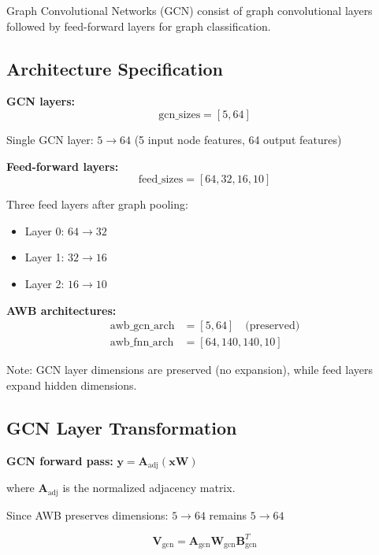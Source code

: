 \documentclass[11pt]{article}
\begin{document}
Graph Convolutional Networks (GCN) consist of graph convolutional layers followed by feed-forward layers for graph classification.

\subsection{Architecture Specification}

\textbf{GCN layers:}
\begin{equation}
\text{gcn\_sizes} = [5, 64]
\end{equation}

Single GCN layer: $5 \rightarrow 64$ (5 input node features, 64 output features)

\textbf{Feed-forward layers:}
\begin{equation}
\text{feed\_sizes} = [64, 32, 16, 10]
\end{equation}

Three feed layers after graph pooling:
\begin{itemize}
    \item Layer 0: $64 \rightarrow 32$
    \item Layer 1: $32 \rightarrow 16$
    \item Layer 2: $16 \rightarrow 10$
\end{itemize}

\textbf{AWB architectures:}
\begin{align}
\text{awb\_gcn\_arch} &= [5, 64] \quad \text{(preserved)} \\
\text{awb\_fnn\_arch} &= [64, 140, 140, 10]
\end{align}

Note: GCN layer dimensions are preserved (no expansion), while feed layers expand hidden dimensions.

\subsection{GCN Layer Transformation}

\textbf{GCN forward pass:} $\mathbf{y} = \mathbf{A}_{\text{adj}} (\mathbf{x} \mathbf{W})$

where $\mathbf{A}_{\text{adj}}$ is the normalized adjacency matrix.

Since AWB preserves dimensions: $5 \rightarrow 64$ remains $5 \rightarrow 64$

\begin{equation}
\mathbf{V}_{\text{gcn}} = \mathbf{A}_{\text{gcn}} \mathbf{W}_{\text{gcn}} \mathbf{B}_{\text{gcn}}^T
\end{equation}
\end{document}
